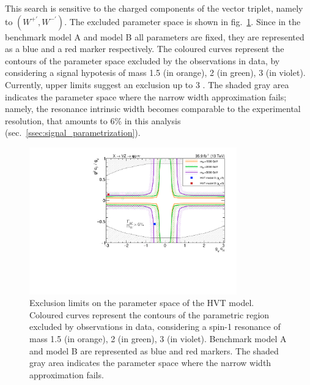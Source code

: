 \noindent This search is sensitive to the charged components of the vector triplet, namely to $(W^{+'}, W^{-'})$. The excluded parameter space is shown in fig.~\ref{fig:interpretation}. Since in the benchmark model A and model B all parameters are fixed, they are represented as a blue and a red marker respectively. The coloured curves represent the contours of the parameter space excluded by the observations in data, by considering a signal hypotesis of mass 1.5 \TeV (in orange), 2 \TeV (in green), 3 \TeV (in violet). Currently, upper limits suggest an exclusion up to 3 \TeV. The shaded gray area indicates the parameter space where the narrow width approximation fails; namely, the resonance intrinsic width becomes comparable to the experimental resolution, that amounts to 6\% in this analysis (sec.~\ref{ssec:signal_parametrization}).

\begin{figure}[!h]
 \begin{center}
   \includegraphics[width=0.8\textwidth]{plotsAlpha_tesi/Limits/HVT_XVZ_Wprime.pdf}
   \caption{Exclusion limits on the parameter space of the HVT model. Coloured curves represent the contours of the parametric region excluded by observations in data, considering a spin-1 \Wp resonance of mass 1.5 \TeV (in orange), 2 \TeV (in green), 3 \TeV (in violet). Benchmark model A and model B are represented as blue and red markers. The shaded gray area indicates the parameter space where the narrow width approximation fails.}
   \label{fig:interpretation}
 \end{center}
\end{figure}

\clearpage


